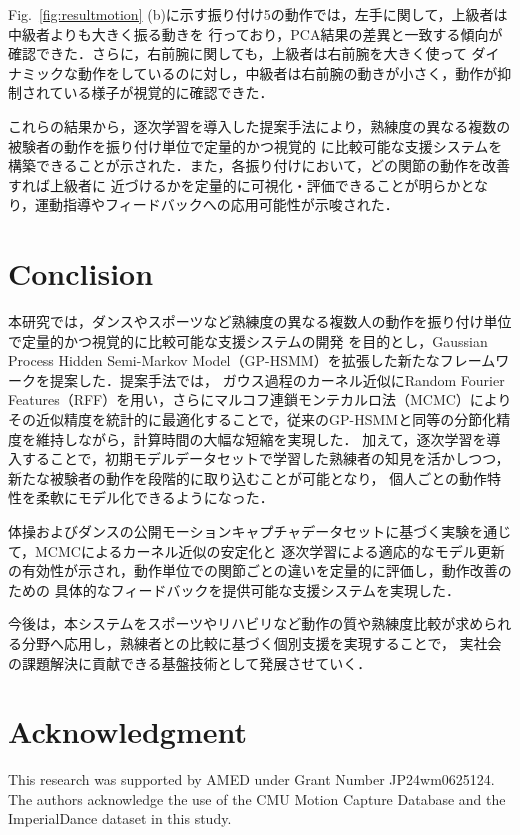 \documentclass[conference]{IEEEtran}
\begin{document}
Fig.~\ref{fig:resultmotion} (b)に示す振り付け5の動作では，左手に関して，上級者は中級者よりも大きく振る動きを
行っており，PCA結果の差異と一致する傾向が確認できた．さらに，右前腕に関しても，上級者は右前腕を大きく使って
ダイナミックな動作をしているのに対し，中級者は右前腕の動きが小さく，動作が抑制されている様子が視覚的に確認できた．

これらの結果から，逐次学習を導入した提案手法により，熟練度の異なる複数の被験者の動作を振り付け単位で定量的かつ視覚的
に比較可能な支援システムを構築できることが示された．また，各振り付けにおいて，どの関節の動作を改善すれば上級者に
近づけるかを定量的に可視化・評価できることが明らかとなり，運動指導やフィードバックへの応用可能性が示唆された．

\section{Conclision}
本研究では，ダンスやスポーツなど熟練度の異なる複数人の動作を振り付け単位で定量的かつ視覚的に比較可能な支援システムの開発
を目的とし，Gaussian Process Hidden Semi-Markov Model（GP-HSMM）を拡張した新たなフレームワークを提案した．提案手法では，
ガウス過程のカーネル近似にRandom Fourier Features（RFF）を用い，さらにマルコフ連鎖モンテカルロ法（MCMC）により
その近似精度を統計的に最適化することで，従来のGP-HSMMと同等の分節化精度を維持しながら，計算時間の大幅な短縮を実現した．
加えて，逐次学習を導入することで，初期モデルデータセットで学習した熟練者の知見を活かしつつ，新たな被験者の動作を段階的に取り込むことが可能となり，
個人ごとの動作特性を柔軟にモデル化できるようになった．

体操およびダンスの公開モーションキャプチャデータセットに基づく実験を通じて，MCMCによるカーネル近似の安定化と
逐次学習による適応的なモデル更新の有効性が示され，動作単位での関節ごとの違いを定量的に評価し，動作改善のための
具体的なフィードバックを提供可能な支援システムを実現した．

今後は，本システムをスポーツやリハビリなど動作の質や熟練度比較が求められる分野へ応用し，熟練者との比較に基づく個別支援を実現することで，
実社会の課題解決に貢献できる基盤技術として発展させていく．

\section*{Acknowledgment}
This research was supported by AMED under Grant Number JP24wm0625124.  
The authors acknowledge the use of the CMU Motion Capture Database and the ImperialDance dataset in this study.
\end{document}
